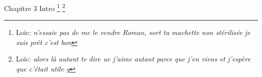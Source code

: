 \newcommand{\todoroman}[1]{{\color{purple}TODO: #1}}

\newcommand{\comseb}[1]{{\color{red}\footnote{\color{red}Seb: \textit{#1}}}}
\newcommand{\comroman}[1]{{\color{purple}\footnote{\color{purple}Roman: \textit{#1}}}}
\newcommand{\commanu}[1]{{\color{teal}\footnote{\color{teal}Manu: \textit{#1}}}}
\newcommand{\commanue}[1]{{\color{blue}\footnote{\color{blue}Manue: \textit{#1}}}}
\newcommand{\comloic}[1]{{\color{orange}\footnote{\color{orange}Loïc: \textit{#1}}}}

\newcommand{\marquepage}{\noindent{\color{violet}Manue, tu t'es arrêtée de lire ici la dernière fois.}\\\begin{center}\texttt{[image: tmp/balrog.png]}\end{center}}
\newcommand{\youshallnotpass}{\noindent{\color{purple}Attention Manue je m'en suis arrêté là :)}\begin{center}\texttt{[image: tmp/gandalf.png]}\end{center}}

Chapitre 3
Intro
\comloic{n'essaie pas de me le vendre Roman, sort ta machette non stérilisée je suis prêt c'est bon}
\comloic{alors là autant te dire ue j'aime autant parce que j'en viens et j'espère que c'était utile ^^'}

